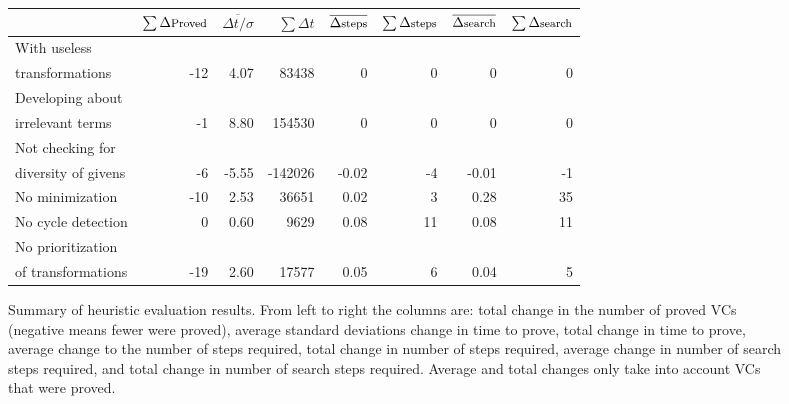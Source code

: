 \setlength{\tabcolsep}{7pt}
\begin{figure}
	\centering
	\begin{tabular}{lrrrrrrr}
		\toprule
			& $\sum \Delta\text{\footnotesize Proved}$	& $\overline{\Delta t / \sigma}$	& $\sum\Delta t$ & $\overline{\Delta\text{\footnotesize steps}}$ & $\sum\Delta\text{\footnotesize steps}$ & $\overline{\Delta\text{\footnotesize search}}$ & $\sum\Delta\text{\footnotesize search}$ \\
		\midrule
		\footnotesize With useless \\
		\footnotesize transformations		& -12	& 4.07	& 83438		& 0	& 0	& 0	& 0	\\
		\midrule
		\footnotesize Developing about \\
		\footnotesize irrelevant terms		& -1	& 8.80	& 154530	& 0	& 0	& 0	& 0\\
		\midrule
		\footnotesize Not checking for \\
		\footnotesize diversity of givens	& -6	& -5.55	& -142026	& -0.02	& -4	& -0.01	& -1	\\
		\midrule
		\footnotesize No minimization		& -10	& 2.53	& 36651		& 0.02	& 3	& 0.28	& 35	\\
		\midrule
		\footnotesize No cycle detection	& 0	& 0.60	& 9629		& 0.08	& 11	& 0.08	& 11	\\
		\midrule
		\footnotesize No prioritization \\
		\footnotesize of transformations	& -19	& 2.60	& 17577		& 0.05	& 6	& 0.04	& 5	\\
		\bottomrule
	\end{tabular}
	\caption{Summary of heuristic evaluation results.  From left to right the columns are: total change in the number of proved VCs (negative means fewer were proved), average standard deviations change in time to prove, total change in time to prove, average change to the number of steps required, total change in number of steps required, average change in number of search steps required, and total change in number of search steps required.  Average and total changes only take into account VCs that were proved.\label{heuristicEvalTable}}
\end{figure}
\setlength{\tabcolsep}{6pt}

